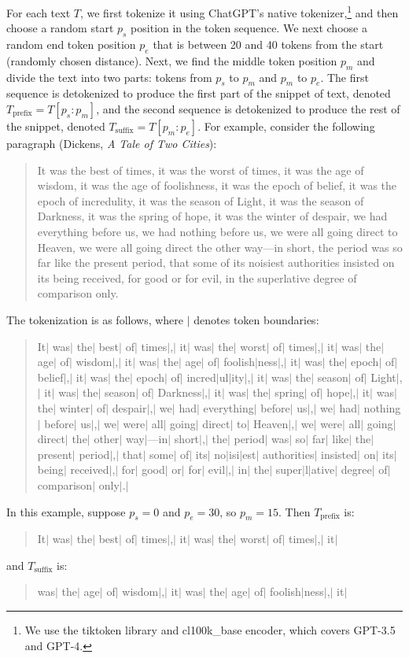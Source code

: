 \documentclass{article}
\begin{document}
For each text $T$, we first tokenize it using ChatGPT's native tokenizer,\footnote{We use the tiktoken library \citep{tiktoken} and cl100k\_base encoder, which covers GPT-3.5 and GPT-4.} and then choose a random start $p_s$ position in the token sequence. We next choose a random end token position $p_e$ that is between 20 and 40 tokens from the start (randomly chosen distance). Next, we find the middle token position $p_m$ and divide the text into two parts: tokens from $p_s$ to $p_m$ and $p_m$ to $p_e$. The first sequence is detokenized to produce the first part of the snippet of text, denoted $T_\textrm{prefix}=T[p_s:p_m]$, and the second sequence is detokenized to produce the rest of the snippet, denoted $T_\textrm{suffix}=T[p_m:p_e]$. For example, consider the following paragraph (Dickens, \emph{A Tale of Two Cities}):
\begin{quote}
    It was the best of times, it was the worst of times, it was the age of wisdom, it was the age of foolishness, it was the epoch of belief, it was the epoch of incredulity, it was the season of Light, it was the season of Darkness, it was the spring of hope, it was the winter of despair, we had everything before us, we had nothing before us, we were all going direct to Heaven, we were all going direct the other way—in short, the period was so far like the present period, that some of its noisiest authorities insisted on its being received, for good or for evil, in the superlative degree of comparison only.
\end{quote}
The tokenization is as follows, where $|$ denotes token boundaries:
\begin{quote}
    It$|$ was$|$ the$|$ best$|$ of$|$ times$|$,$|$ it$|$ was$|$ the$|$ worst$|$ of$|$ times$|$,$|$ it$|$ was$|$ the$|$ age$|$ of$|$ wisdom$|$,$|$ it$|$ was$|$ the$|$ age$|$ of$|$ foolish$|$ness$|$,$|$ it$|$ was$|$ the$|$ epoch$|$ of$|$ belief$|$,$|$ it$|$ was$|$ the$|$ epoch$|$ of$|$ incred$|$ul$|$ity$|$,$|$ it$|$ was$|$ the$|$ season$|$ of$|$ Light$|$,$|$ it$|$ was$|$ the$|$ season$|$ of$|$ Darkness$|$,$|$ it$|$ was$|$ the$|$ spring$|$ of$|$ hope$|$,$|$ it$|$ was$|$ the$|$ winter$|$ of$|$ despair$|$,$|$ we$|$ had$|$ everything$|$ before$|$ us$|$,$|$ we$|$ had$|$ nothing$|$ before$|$ us$|$,$|$ we$|$ were$|$ all$|$ going$|$ direct$|$ to$|$ Heaven$|$,$|$ we$|$ were$|$ all$|$ going$|$ direct$|$ the$|$ other$|$ way$|$—in$|$ short$|$,$|$ the$|$ period$|$ was$|$ so$|$ far$|$ like$|$ the$|$ present$|$ period$|$,$|$ that$|$ some$|$ of$|$ its$|$ no$|$isi$|$est$|$ authorities$|$ insisted$|$ on$|$ its$|$ being$|$ received$|$,$|$ for$|$ good$|$ or$|$ for$|$ evil$|$,$|$ in$|$ the$|$ super$|$l$|$ative$|$ degree$|$ of$|$ comparison$|$ only$|$.$|$
\end{quote}
In this example, suppose $p_s = 0$ and $p_e = 30$, so $p_m=15$. Then $T_\textrm{prefix}$ is:
\begin{quote}
    It$|$ was$|$ the$|$ best$|$ of$|$ times$|$,$|$ it$|$ was$|$ the$|$ worst$|$ of$|$ times$|$,$|$ it$|$
\end{quote}
and $T_\textrm{suffix}$ is:
\begin{quote}
     was$|$ the$|$ age$|$ of$|$ wisdom$|$,$|$ it$|$ was$|$ the$|$ age$|$ of$|$ foolish$|$ness$|$,$|$ it$|$
\end{quote}
\end{document}
